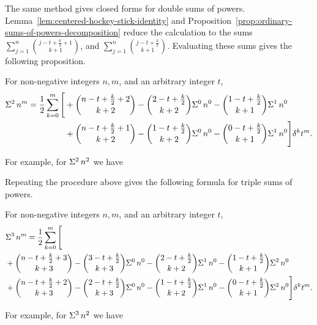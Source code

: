 The same method gives closed forms for double sums of powers. Lemma~\eqref{lem:centered-hockey-stick-identity} and Proposition~\eqref{prop:ordinary-sums-of-powers-decomposition} reduce the calculation to the sums
$\sum_{j=1}^{n} \binom{j -t + \frac{k}{2} +1}{k+1}$,
and $\sum_{j=1}^{n} \binom{j -t + \frac{k}{2}}{k+1}$.
Evaluating these sums gives the following proposition.
\begin{proposition}
  \label{prop:double-sums-of-powers-decomposition}
  For non-negative integers $n,m$, and an arbitrary integer $t$,
  \begin{align*}
    \Sigma^{2}\,{n}^{m} = \frac{1}{2} \sum_{k=0}^{m}
    \Bigg[
      &+ \binom{n -t + \frac{k}{2} +2}{k+2} - \binom{2 -t + \tfrac{k}{2}}{k+2} \Sigma^{0}\,{n}^{0} - \binom{1 -t + \tfrac{k}{2}}{k+1} \Sigma^{1}\,{n}^{0} \\
      &+ \binom{n -t + \frac{k}{2}+1}{k+2} - \binom{1-t + \tfrac{k}{2}}{k+2} \Sigma^{0}\,{n}^{0} - \binom{0-t + \tfrac{k}{2}}{k+1} \Sigma^{1}\,{n}^{0}
    \Bigg] \delta^{k} t^m.
  \end{align*}
\end{proposition}
For example, for $\Sigma^{2}\,{n}^{2}$ we have

Repeating the procedure above gives the following formula for triple sums of powers.
\begin{proposition}
  \label{prop:triple-sums-of-powers-decomposition}
  For non-negative integers $n,m$, and an arbitrary integer $t$,
  \begin{align*}
    &\Sigma^{3}\,{n}^{m}
    = \frac{1}{2} \sum_{k=0}^{m}
    \Bigg[ \\
      &+ \binom{n -t + \frac{k}{2} +3}{k+3} - \binom{3 -t + \tfrac{k}{2}}{k+3} \Sigma^{0}\,{n}^{0} - \binom{2 -t + \tfrac{k}{2}}{k+2} \Sigma^{1}\,{n}^{0} - \binom{1 -t + \tfrac{k}{2}}{k+1} \Sigma^{2}\,{n}^{0} \\
      &+ \binom{n -t + \frac{k}{2}+2}{k+3} - \binom{2-t + \tfrac{k}{2}}{k+3} \Sigma^{0}\,{n}^{0} - \binom{1-t + \tfrac{k}{2}}{k+2} \Sigma^{1}\,{n}^{0} - \binom{0-t + \tfrac{k}{2}}{k+1} \Sigma^{2}\,{n}^{0}
    \Bigg] \delta^{k} t^m.
  \end{align*}
\end{proposition}
For example, for $\Sigma^{3}\,{n}^{2}$ we have

